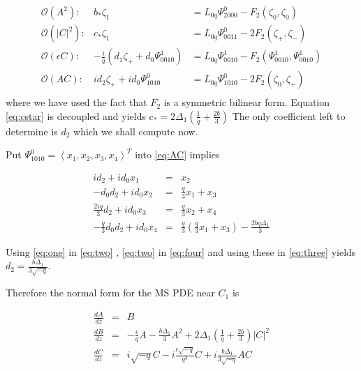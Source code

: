 \begin{subequations}
\begin{eqnarray}
\mathcal{O}(A^2): &		b_* \zeta_1 &= L_{0q} \Psi_{2000}^0 - F_2(\zeta_0,\zeta_0) \\
\mathcal{O}(\left|C\right|^2):&	c_* \zeta_1 &= L_{0q} \Psi_{0011}^0 -2 F_2(\zeta_+,\zeta_-) \label{eq:cstar} \\
\mathcal{O}(\epsilon C): &-\frac{i}{q} \left(d_1 \zeta_+ +  d_0 \Psi_{0010}^1\right) &= L_{0q} \Psi_{0010}^1 - F_2(\Psi_{0010}^1,\Psi_{0010}^1) \\
\mathcal{O}(A C): 	&i d_2 \zeta_+ + i d_0 \Psi_{1010}^0 &= L_{0q} \Psi_{1010}^0 - 2 F_2(\zeta_0,\zeta_+) \\ \label{eq:AC}
\end{eqnarray}
\end{subequations}
where we have used the fact that $F_2$ is a symmetric bilinear form. Equation \eqref{eq:cstar} is decoupled and yields 
$ c_* = 2 \Delta_1 \left(\frac{1}{q} + \frac{2 b}{3} \right)$ The only coefficient left to determine is $d_2$ which we shall compute now. 

Put $\Psi_{1010}^0 = \left<x_1,x_2,x_3,x_4\right>^T$  into \eqref{eq:AC} implies 

\begin{subequations}
\begin{eqnarray}
i d_2 + i d_0 x_1 &=& x_2 \label{eq:one} \\
- d_0 d_2 + i d_0 x_2 &=& \frac{q}{3} x_1 + x_3 \label{eq:two} \\
\frac{2 i q}{3} d_2 + i d_0 x_3 &=& \frac{q}{3} x_2 + x_4  \label{eq:three} \\
- \frac{q}{3} d_0 d_2 + i d_0 x_4 &=& \frac{q}{3}\left(\frac{q}{3} x_1 + x_3 \right) - \frac{ 2 b q \Delta_1} {3} \label{eq:four}
\end{eqnarray}
\end{subequations}

Using \eqref{eq:one} in \eqref{eq:two} , \eqref{eq:two} in \eqref{eq:four} and using these in \eqref{eq:three} yields $ d_2 = \frac{ b \Delta_1 }{ 3 \sqrt{-q} } $.

Therefore the normal form for the MS PDE near $C_1$ is 

\begin{subequations}
\begin{eqnarray}
\frac{dA}{dz} &=& B \\ \label{eq:normalA}
\frac{dB}{dz} &=& -\frac{\epsilon}{q} A - \frac{b \Delta_1 }{3} A^2 + 2 \Delta_1 \left(\frac{1}{q} + \frac{2 b }{3} \right) \left|C\right|^2 \\ \label{eq:normalB}
\frac{dC}{dz} &=& i \sqrt{-q} C - i \frac{\epsilon \sqrt{-q} }{q^3} C + i \frac{b \Delta_1}{3 \sqrt{-q}} A C \label{eq:normalC}
\end{eqnarray}
\end{subequations}


